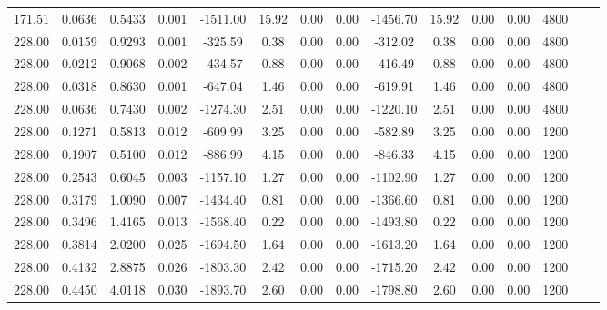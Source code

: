 \documentclass[%
 aip,
 jcp,
 sd,%
 amsmath,amssymb,
]{revtex4-1}
\begin{document}
\begin{table*}[!htbp]
\begin{ruledtabular}
\begin{tabular}{ccccccccccccccc}
171.51	&	0.0636	&	0.5433	&	0.001	&	-1511.00	&	15.92	&	0.00	&	0.00	&	-1456.70	&	15.92	&	0.00	&	0.00	&	4800	\\
228.00	&	0.0159	&	0.9293	&	0.001	&	-325.59	&	0.38	&	0.00	&	0.00	&	-312.02	&	0.38	&	0.00	&	0.00	&	4800	\\
228.00	&	0.0212	&	0.9068	&	0.002	&	-434.57	&	0.88	&	0.00	&	0.00	&	-416.49	&	0.88	&	0.00	&	0.00	&	4800	\\
228.00	&	0.0318	&	0.8630	&	0.001	&	-647.04	&	1.46	&	0.00	&	0.00	&	-619.91	&	1.46	&	0.00	&	0.00	&	4800	\\
228.00	&	0.0636	&	0.7430	&	0.002	&	-1274.30	&	2.51	&	0.00	&	0.00	&	-1220.10	&	2.51	&	0.00	&	0.00	&	4800	\\
228.00	&	0.1271	&	0.5813	&	0.012	&	-609.99	&	3.25	&	0.00	&	0.00	&	-582.89	&	3.25	&	0.00	&	0.00	&	1200	\\
228.00	&	0.1907	&	0.5100	&	0.012	&	-886.99	&	4.15	&	0.00	&	0.00	&	-846.33	&	4.15	&	0.00	&	0.00	&	1200	\\
228.00	&	0.2543	&	0.6045	&	0.003	&	-1157.10	&	1.27	&	0.00	&	0.00	&	-1102.90	&	1.27	&	0.00	&	0.00	&	1200	\\
228.00	&	0.3179	&	1.0090	&	0.007	&	-1434.40	&	0.81	&	0.00	&	0.00	&	-1366.60	&	0.81	&	0.00	&	0.00	&	1200	\\
228.00	&	0.3496	&	1.4165	&	0.013	&	-1568.40	&	0.22	&	0.00	&	0.00	&	-1493.80	&	0.22	&	0.00	&	0.00	&	1200	\\
228.00	&	0.3814	&	2.0200	&	0.025	&	-1694.50	&	1.64	&	0.00	&	0.00	&	-1613.20	&	1.64	&	0.00	&	0.00	&	1200	\\
228.00	&	0.4132	&	2.8875	&	0.026	&	-1803.30	&	2.42	&	0.00	&	0.00	&	-1715.20	&	2.42	&	0.00	&	0.00	&	1200	\\
228.00	&	0.4450	&	4.0118	&	0.030	&	-1893.70	&	2.60	&	0.00	&	0.00	&	-1798.80	&	2.60	&	0.00	&	0.00	&	1200	\\
\end{tabular}
\end{ruledtabular}
\end{table*}
\end{document}
